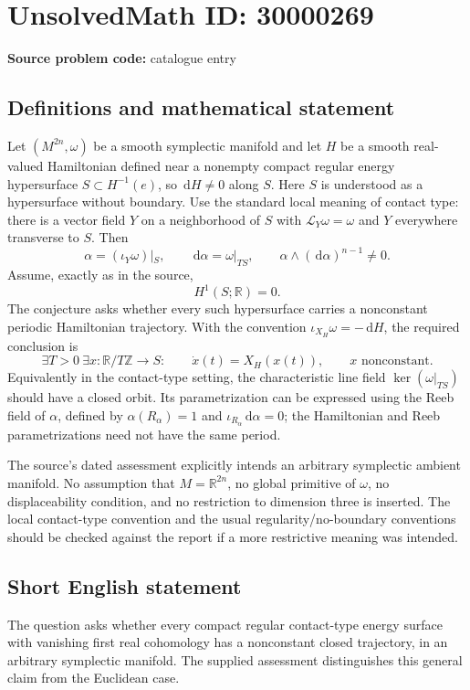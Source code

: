 \documentclass[11pt]{article}
\newcommand{\Z}{\mathbb{Z}}
\newcommand{\R}{\mathbb{R}}
\newcommand{\dd}{\,\mathrm{d}}
\begin{document}
\section*{UnsolvedMath ID: 30000269}
\textbf{Source problem code:} catalogue entry
\subsection{Definitions and mathematical statement}
Let $(M^{2n},\omega)$ be a smooth symplectic manifold and let $H$ be a smooth real-valued Hamiltonian defined near a nonempty compact regular energy hypersurface $S\subset H^{-1}(e)$, so $\dd H\ne0$ along $S$. Here $S$ is understood as a hypersurface without boundary. Use the standard local meaning of contact type: there is a vector field $Y$ on a neighborhood of $S$ with $\mathcal L_Y\omega=\omega$ and $Y$ everywhere transverse to $S$. Then
\[
 \alpha=(\iota_Y\omega)|_S,\qquad \dd\alpha=\omega|_{TS},\qquad
 \alpha\wedge(\dd\alpha)^{n-1}\ne0.
\]
Assume, exactly as in the source,
\[
 H^1(S;\R)=0.
\]
The conjecture asks whether every such hypersurface carries a nonconstant periodic Hamiltonian trajectory. With the convention $\iota_{X_H}\omega=-\dd H$, the required conclusion is
\[
 \exists T>0\ \exists x:\R/T\Z\longrightarrow S:
 \qquad \dot x(t)=X_H(x(t)),\qquad x\text{ nonconstant}.
\]
Equivalently in the contact-type setting, the characteristic line field $\ker(\omega|_{TS})$ should have a closed orbit. Its parametrization can be expressed using the Reeb field of $\alpha$, defined by $\alpha(R_\alpha)=1$ and $\iota_{R_\alpha}\dd\alpha=0$; the Hamiltonian and Reeb parametrizations need not have the same period.

The source's dated assessment explicitly intends an arbitrary symplectic ambient manifold. No assumption that $M=\R^{2n}$, no global primitive of $\omega$, no displaceability condition, and no restriction to dimension three is inserted. The local contact-type convention and the usual regularity/no-boundary conventions should be checked against the report if a more restrictive meaning was intended.
\subsection{Short English statement}
The question asks whether every compact regular contact-type energy surface with vanishing first real cohomology has a nonconstant closed trajectory, in an arbitrary symplectic manifold. The supplied assessment distinguishes this general claim from the Euclidean case.
\end{document}
